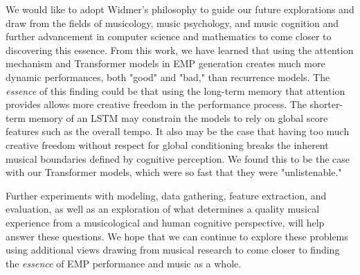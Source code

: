 We would like to adopt Widmer's philosophy to guide our future explorations and draw from the fields of musicology, music psychology, and music cognition and further advancement in computer science and mathematics to come closer to discovering this essence. From this work, we have learned that using the attention mechanism and Transformer models in EMP generation creates much more dynamic performances, both "good" and "bad," than recurrence models. The \emph{essence} of this finding could be that using the long-term memory that attention provides allows more creative freedom in the performance process. The shorter-term memory of an LSTM may constrain the models to rely on global score features such as the overall tempo. It also may be the case that having too much creative freedom without respect for global conditioning breaks the inherent musical boundaries defined by cognitive perception. We found this to be the case with our Transformer models, which were so fast that they were "unlistenable." 

Further experiments with modeling, data gathering, feature extraction, and evaluation, as well as an exploration of what determines a quality musical experience from a musicological and human cognitive perspective, will help answer these questions. We hope that we can continue to explore these problems using additional views drawing from musical research to come closer to finding the \emph{essence} of EMP performance and music as a whole. 
